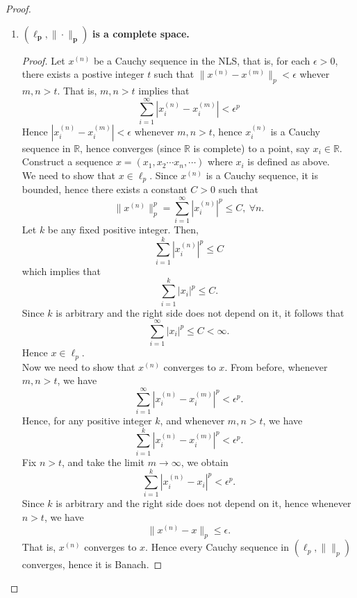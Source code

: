 \begin{eg}
\begin{proof}
\begin{enumerate}
            \item $\bm{(\ell_{p},\|\cdot\|_{p})}$\textbf{ is a complete space.}
                \begin{proof}
                    Let $x^{(n)}$ be a Cauchy sequence in the NLS, that is, for each $\epsilon>0$, there exists a postive integer $t$ such that $\|x^{(n)}-x^{(m)}\|_{p}<\epsilon$ whever $m,n>t$. That is, $m,n>t$ implies that $$\sum_{i=1}^{\infty}|x_{i}^{(n)}-x_{i}^{(m)}|<\epsilon^{p}$$ 
                    Hence $\left|x_{i}^{(n)}-x_{i}^{(m)}\right|<\epsilon$ whenever $m,n>t$, hence $x_{i}^{(n)}$ is a Cauchy sequence in $\mathbb{R}$, hence converges (since $\mathbb{R}$ is complete) to a point, say $x_{i}\in \mathbb{R}$.\\ 
                    Construct a sequence $x=(x_{1},x_{2}\cdots x_{n},\cdots)$ where $x_{i}$ is defined as above.\\
                    We need to show that $x\in\ell_{p}$. Since $x^{(n)}$ is a Cauchy sequence, it is bounded, hence there exists a constant $C>0$ such that $$\|x^{(n)}\|_{p}^{p}=\sum_{i=1}^{\infty}\left|x_{i}^{(n)}\right|^{p}\leq C,~\forall n.$$
                    Let $k$ be any fixed positive integer. Then, $$\sum_{i=1}^{k}\left|x_{i}^{(n)}\right|^{p}\leq C$$ which implies that $$\sum_{i=1}^{k}\left|x_{i}\right|^{p}\leq C.$$
                    Since $k$ is arbitrary and the right side does not depend on it, it follows that $$\sum_{i=1}^{\infty}\left|x_{i}\right|^{p}\leq C<\infty.$$
                    Hence $x\in\ell_{p}$.\\ 
                    Now we need to show that $x^{(n)}$ converges to $x$. From before, whenever $m,n>t$, we have $$\sum_{i=1}^{\infty}|x_{i}^{(n)}-x_{i}^{(m)}|^{p}<\epsilon^{p}.$$
                    Hence, for any positive integer $k$, and whenever $m,n>t$, we have $$\sum_{i=1}^{k}|x_{i}^{(n)}-x_{i}^{(m)}|^{p}<\epsilon^{p}.$$
                    Fix $n>t$, and take the limit $m\to\infty$, we obtain $$\sum_{i=1}^{k}|x_{i}^{(n)}-x_{i}|^{p}<\epsilon^{p}.$$
                    Since $k$ is arbitrary and the right side does not depend on it, hence whenever $n>t$, we have $$\|x^{(n)}-x\|_{p}\leq \epsilon.$$
                    That is, $x^{(n)}$ converges to $x$.
                    Hence every Cauchy sequence in $(\ell_{p},\|\|_{p})$ converges, hence it is Banach.
                \end{proof}
        \end{enumerate}
        \phantom\qedhere
    \end{proof}
\end{eg}
